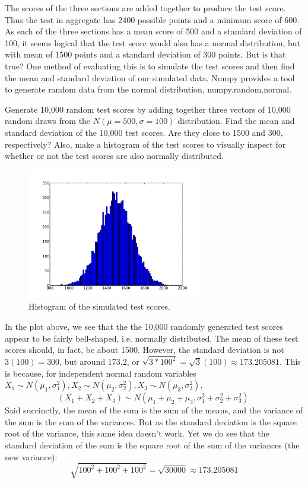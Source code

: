 The scores of the three sections are added together to produce the test score. Thus the test in aggregate has 2400 possible points and a minimum score of 600.  As each of the three sections has a mean score of 500 and a standard deviation of 100, it seems logical that the test score would also has a normal distribution, but with mean of 1500 points and a standard deviation of 300 points. But is that true? One method of evaluating this is to simulate the test scores and then find the mean and standard deviation of our simulated data. Numpy provides a tool to generate random data from the normal distribution, numpy.random.normal.

\begin{problem}
Generate 10,000 random test scores by adding together three vectors of 10,000 random draws from the $N(\mu=500,\sigma=100)$ distribution. Find the mean and standard deviation of the 10,000 test scores. Are they close to 1500 and 300, respectively? Also, make a histogram of the test scores to visually inspect for whether or not the test scores are also normally distributed.
\end{problem}

\begin{figure}
\centering
\includegraphics[width=3in]{scorehist.pdf}
\caption{Histogram of the simulated test scores.}
\end{figure}

In the plot above, we see that the the 10,000 randomly generated test scores appear to be fairly bell-shaped, i.e. normally distributed. The mean of these test scores should, in fact, be about 1500. However, the standard deviation is not $3(100) = 300$, but around 173.2, or $\sqrt{3*100^2}=\sqrt{3}(100) \approx 173.205081$. This is because, for independent normal random variables $X_1 \sim N(\mu_1,\sigma^2_1), X_2 \sim N(\mu_2,\sigma^2_2),X_3 \sim N(\mu_3,\sigma^2_3),$
 $$ (X_1 +X_2 +X_3) \sim N(\mu_1+\mu_2+\mu_3, \sigma^2_1+\sigma^2_2+\sigma^2_3).$$
 Said succinctly, the mean of the sum is the sum of the means, and the variance of the sum is the sum of the variances. But as the standard deviation is the square root of the variance, this same idea doesn't work. Yet we do see that the standard deviation of the sum is the square root of the sum of the variances (the new variance):
 $$\sqrt{100^2+100^2+100^2} = \sqrt{30000} \approx 173.205081$$

